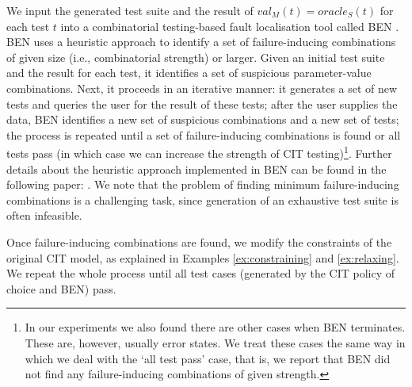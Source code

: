 \begin{tikzborder}{\cite{Gargantini16:validation}}
\begin{tikzborder}{\cite{gargantini_combinatorial_2017}}
\begin{tikzborder}{\cite{gargantini_combinatorial_2017}}
We input the generated test suite and the result of $val_{M}(t)=\mathit{oracle}_{S}(t)$ for each test $t$ into a combinatorial testing-based fault localisation tool called BEN \cite{ben_2015}. BEN uses a heuristic approach to identify a set of failure-inducing combinations of given size (i.e., combinatorial strength) or larger. Given an initial test suite and the result for each test, it identifies a set of suspicious parameter-value combinations. Next, it proceeds in an iterative manner: it generates a set of new tests and queries the user for the result of these tests; after the user supplies the data, BEN identifies a new set of suspicious combinations and a new set of tests; the process is repeated until a set of failure-inducing combinations is found or all tests pass (in which case we can increase the strength of CIT testing)\footnote{In our experiments we also found there are other cases when BEN terminates. These are, however, usually error states. We treat these cases the same way in which we deal with the `all test pass' case, that is, we report that BEN did not find any failure-inducing combinations of given strength.}.
Further details about the heuristic approach implemented in BEN can be found in the following paper: \cite{ben_2015}.
We note that the problem of finding minimum failure-inducing combinations is a challenging task, since generation of an exhaustive test suite is often infeasible. 

Once failure-inducing combinations are found, we modify the constraints of the original CIT model, as explained in Examples \ref{ex:constraining} and \ref{ex:relaxing}. We repeat the whole process until all test cases (generated by the CIT policy of choice and BEN) pass. 


\end{tikzborder}
\end{tikzborder}
\end{tikzborder}
